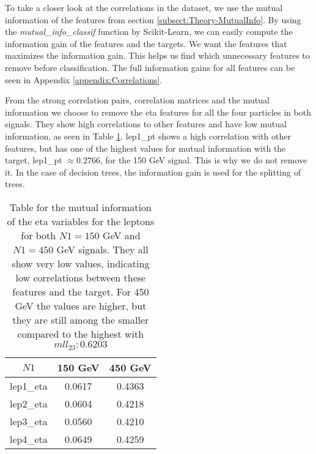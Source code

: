 \documentclass[a4paper, american, 12pt]{report}
\begin{document}
	To take a closer look at the correlations in the dataset, we use the mutual information of the features from section \ref{subsect:Theory-MutualInfo}. By using the \textit{mutual\_info\_classif} function by Scikit-Learn, we can easily compute the information gain of the features and the targets. We want the features that maximizes the information gain. This helps us find which unnecessary features to remove before classification. The full information gains for all features can be seen in Appendix \ref{appendix:Correlations}.
	
	From the strong correlation pairs, correlation matrices and the mutual information we choose to remove the eta features for all the four particles in both signals. They show high correlations to other features and have low mutual information, as seen in Table \ref{tab:MutualInfo_eta}. lep1\_pt shows a high correlation with other features, but has one of the highest values for mutual information with the target, lep1\_pt $\approx 0.2766$, for the 150 GeV signal. This is why we do not remove it. In the case of decision trees, the information gain is used for the splitting of trees.
	\begin{table}[htbp!]
		\centering
		\begin{tabular}{ |c|c|c| }
			\hline \rule{0pt}{13pt}
			$N1$ & 150 GeV  & 450 GeV   \\
			\hline \rule{0pt}{13pt}
			lep1\_eta & 0.0617 & 0.4363 \\
			\hline \rule{0pt}{13pt}
			lep2\_eta & 0.0604 & 0.4218  \\
			\hline \rule{0pt}{13pt}
			lep3\_eta & 0.0560 & 0.4210 \\
			\hline \rule{0pt}{13pt}
			lep4\_eta & 0.0649 & 0.4259 \\
			\hline
		\end{tabular}	
		\caption[Mutual information for eta-values.]{Table for the mutual information of the eta variables for the leptons for both $N1=150$ GeV and $N1=450$ GeV signals. They all show very low values, indicating low correlations between these features and the target. For 450 GeV the values are higher, but they are still among the smaller compared to the highest with $mll_{23}:0.6203$}
		\label{tab:MutualInfo_eta}
	\end{table}
	
	
\end{document}
